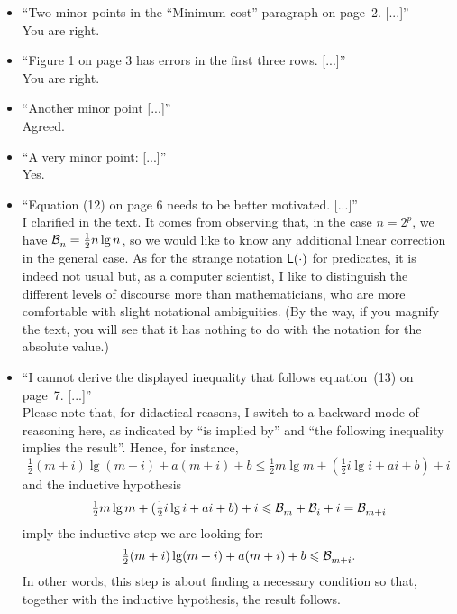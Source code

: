\documentclass[10pt]{article}
\begin{document}
\begin{itemize}

  \item ``Two minor points in the “Minimum cost” paragraph on page~2.
     [...]''\\
     You are right.

  \item ``Figure 1 on page 3 has errors in the first three
    rows. [...]''\\
    You are right.

  \item ``Another minor point [...]''\\
    Agreed.

  \item ``A very minor point: [...]''\\
    Yes.

  \item ``Equation (12) on page 6 needs to be better
    motivated. [...]''\\
    I clarified in the text. It comes from observing that, in the case
    \(n=2^p\), we have \(\mathcal{B}_{n}^{} = \frac{1}{2}n\lg n\), so we would
    like to know any additional linear correction in the general
    case. As for the strange notation \(\textsf{L}({\cdot})\) for
    predicates, it is indeed not usual but, as a computer scientist, I
    like to distinguish the different levels of discourse more than
    mathematicians, who are more comfortable with slight notational
    ambiguities. (By the way, if you magnify the text, you will see
    that it has nothing to do with the notation for the absolute
    value.)
    
  \item ``I cannot derive the displayed inequality that follows
    equation~(13) on page~7. [...]''\\
    Please note that, for didactical reasons, I switch to a backward
    mode of reasoning here, as indicated by ``is implied by'' and
    ``the following inequality implies the result''. Hence, for
    instance,
\begin{equation*}
\tfrac{1}{2}(m+i)\lg(m+i) + a(m+i) + b
\leqslant
\tfrac{1}{2}m\lg m + (\tfrac{1}{2}i\lg i + ai + b) + i
\end{equation*}
and the inductive hypothesis 
\begin{equation*}
\tfrac{1}{2}m\lg m + (\tfrac{1}{2}i\lg i + ai + b) + i
\leqslant 
\mathcal{B}_{m}^{} + \mathcal{B}_{i}^{} + i = \mathcal{B}_{m+i}^{}
\end{equation*}
imply the inductive step we are looking for:
\begin{equation*}
\tfrac{1}{2}(m+i)\lg(m+i) + a(m+i) +
b \leqslant \mathcal{B}_{m+i}^{}.
\end{equation*}
In other words, this step is about finding a necessary condition so
that, together with the inductive hypothesis, the result follows.


\end{itemize}
\end{document}
